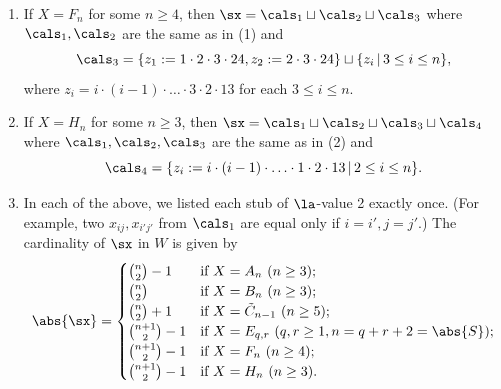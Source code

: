 \begin{thm}
\begin{enumerate}
\[\begin{cases}
                \end{cases}
            \]
        \item If $X=F_n$ for some $n\ge 4$, then $\sx=\cals_1\sqcup\cals_2\sqcup\cals_3$
            where  $\cals_1,\cals_2$ are the same as in \textup{(}1\textup{)} and 
            \[
                \cals_3=\{
                    z_1:=1\cdot 2\cdot 3\cdot 24, z_2:=2\cdot 3\cdot
                24\}\sqcup\{z_i\,\vert\, 3\le i\le n\}, 
            \]
            where $z_i=i\cdot (i-1)\cdot \ldots\cdot 3\cdot 2\cdot 13$ for each $3\le i\le n$.
        \item If $X=H_n$ for some $n\ge 3$, then $\sx=\cals_1\sqcup\cals_2\sqcup\cals_3\sqcup\cals_4$ where
            $\cals_1,\cals_2,\cals_3$ are the same as in \textup{(}2\textup{)} and 
            \[
                \cals_4=\{z_i:=i\cdot (i-1)\cdot \ldots\cdot 1\cdot 2\cdot 13\,\vert\,
                2\le i\le n\}.
            \]
        \item In each of the above, we listed each stub of $\la$-value 2 exactly once. {\textup{(}}For example, two
            $x_{ij},x_{i'j'}$ from $ \cals_1$ are equal only if $i=i',j=j'$.{\textup{)}} The cardinality of $\sx$ 
            in $W$ is given by 
            \[ 
                \abs{\sx}=
                \begin{cases}\binom{n}{2} -1 & \text{if $X=A_n$ \textup{(}$n\ge 3$\textup{)}};\\ 
                    \binom{n}{2} & \text{if
                      $X=B_n$ \textup{(}$n\ge 3$\textup{)}};\\ 
                      \binom{n}{2} +1 & \text{if $X=\tilde C_{n-1}$
                      \textup{(}$n\ge 5$\textup{)}};\\ 
                      \binom{n+1}{2}-1 & \text{if $X= E_{q,r}$ \textup{(}$q,r\ge 1, n=q+r+2=\abs{S}$\textup{)}};\\ 
                      \binom{n+1}{2}-1 & \text{if $X= F_n$ \textup{(}$n\ge 4$\textup{)}};\\
                      \binom{n+1}{2}-1 & \text{if $X= H_n$ \textup{(}$n\ge 3$\textup{)}}.
                \end{cases} 
            \]
    \end{enumerate}
\end{thm}


